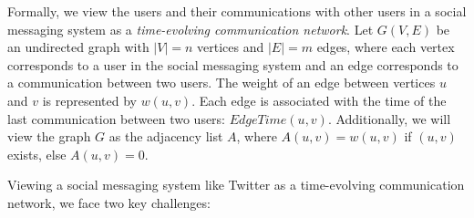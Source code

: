 \documentclass{sig-alternate}
\newcommand{\squishlist}{
 \begin{list}{$\bullet$}
  { \setlength{\itemsep}{0pt}
     \setlength{\parsep}{3pt}
     \setlength{\topsep}{3pt}
     \setlength{\partopsep}{0pt}
     \setlength{\leftmargin}{1.5em}
     \setlength{\labelwidth}{1em}
     \setlength{\labelsep}{0.5em} } }
\newcommand{\squishend}{
  \end{list}  }
\begin{document}



Formally, we view the users and their communications with other users in a social messaging
system as a \textit{time-evolving communication network}. Let $G(V,E)$ be an
undirected graph with $|V| = n$ vertices and $|E| = m$ edges, where each vertex
corresponds to a user in the social messaging system and an edge corresponds to a
communication between two users. The weight of an edge between vertices $u$ and
$v$ is represented by $w(u, v)$. Each edge is associated with the time of the last communication between two users: $EdgeTime(u,v)$.  Additionally, we will view the graph $G$ as the adjacency list $A$, where $A(u, v) = w(u, v)$ if $(u, v)$ exists, else $A(u, v) = 0$.

Viewing a social messaging system like Twitter as a time-evolving communication network, we face two key challenges:




\end{document}
